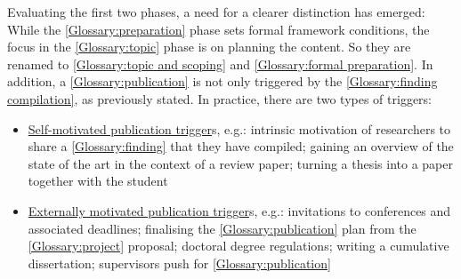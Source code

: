 \documentclass{bausteinefdm}
\begin{document}



Evaluating the first two phases, a need for a clearer distinction has emerged: 
While the \ref{Glossary:preparation} phase sets formal framework conditions, the focus in the \ref{Glossary:topic} phase is on planning the content. So they are renamed to \ref{Glossary:topic and scoping} and \ref{Glossary:formal preparation}. 
In addition, a \ref{Glossary:publication} is not only triggered by the \ref{Glossary:finding compilation}, as previously stated. 
In practice, there are two types of triggers:
\begin{itemize}
    \item \hyperref[Glossary:self-motivated publication trigger]{Self-motivated publication trigger}s, e.g.: intrinsic motivation of researchers to share a \ref{Glossary:finding} that they have compiled; gaining an overview of the state of the art in the context of a review paper; turning a thesis into a paper together with the student
    \item \hyperref[Glossary:externally motivated publication trigger]{Externally motivated publication trigger}s, e.g.: invitations to conferences and associated deadlines; finalising the \ref{Glossary:publication} plan from the \ref{Glossary:project} proposal; doctoral degree regulations; writing a cumulative dissertation; supervisors push for \ref{Glossary:publication}
\end{itemize}


\end{document}
